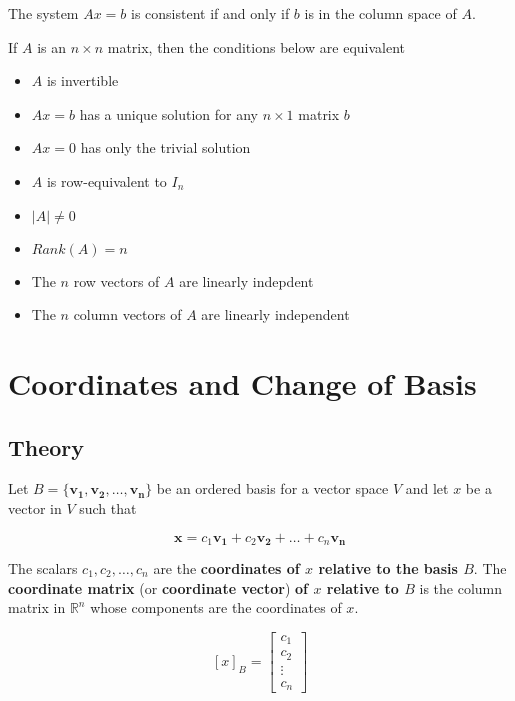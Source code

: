 \documentclass{report}
\begin{document}
\begin{tcolorbox}[title = Solutions of a System of Linear Equations]
	The system $Ax=b$ is consistent if and only if $b$ is in the column space of $A$.
\end{tcolorbox}

\begin{tcolorbox}[title = Summary of Equivalent Conditions for Square Matrices]
		If $A$ is an $n \times n$ matrix, then the conditions below are equivalent
		
		\begin{itemize}
			\item $A$ is invertible
			\item $Ax=b$ has a unique solution for any $n \times 1$ matrix $b$
			\item $Ax=0$ has only the trivial solution
			\item $A$ is row-equivalent to $I_n$
			\item $|A| \ne 0$
			\item $Rank(A) =n$
			\item The $n$ row vectors of $A$ are linearly indepdent
			\item The $n$ column vectors of $A$ are linearly independent
		\end{itemize}
\end{tcolorbox}

\section{Coordinates and Change of Basis}

\subsection{Theory}

\begin{tcolorbox}[title = Coordinate Representation Relative to a Basis]
		Let $B = \{ \bm{v_1}, \bm{v_2}, \hdots, \bm{v_n} \}$ be an ordered basis for a vector space $V$ and let $x$ be a vector in $V$ such that 
		
		$$
		\bm{x} = c_1 \bm{v_1} + c_2 \bm{v_2} + \hdots + c_n \bm{v_n}
		$$
		
		The scalars $c_1, c_2, \hdots, c_n$ are the \textbf{coordinates of $x$ relative to the basis $B$}. The \textbf{coordinate matrix} (or \textbf{coordinate vector}) \textbf{ of $x$ relative to $B$} is the column matrix in $\mathbb{R}^n$ whose components are the coordinates of $x$.
		
		$$
		[x]_B = \begin{bmatrix} c_1 \\ c_2 \\ \vdots \\ c_n \end{bmatrix}
		$$
\end{tcolorbox}
\end{document}
